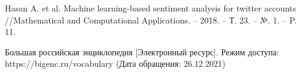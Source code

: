 \documentclass[a4paper,14pt, unknownkeysallowed]{extreport}
\begin{document}
\begin{thebibliography}{100}
	 Hasan A. et al. Machine learning-based sentiment analysis for twitter accounts //Mathematical and Computational Applications. -- 2018. -- Т. 23. -- №. 1. -- P. 11.
	
	 Большая российская энциклопедия [Электронный ресурс]. Режим доступа: https://bigenc.ru/vocabulary (Дата обращения: 26.12.2021)
	
	
\end{thebibliography}
\end{document}
